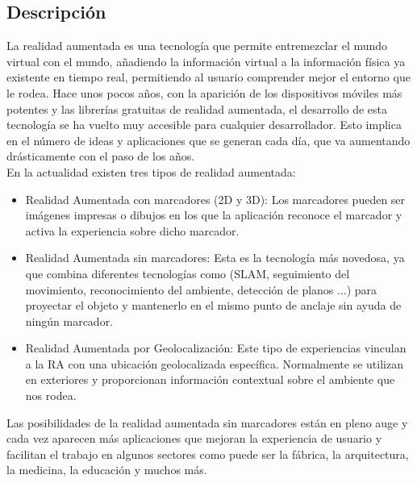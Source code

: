 \subsection{Descripción}
La realidad aumentada es una tecnología que permite entremezclar el mundo virtual con el mundo, añadiendo la información virtual a la información física ya existente en tiempo real, permitiendo al usuario comprender mejor el entorno que le rodea. Hace unos pocos años, con la aparición de los dispositivos móviles más potentes y las librerías gratuitas de realidad aumentada, el desarrollo de esta tecnología se ha vuelto muy accesible para cualquier desarrollador. Esto implica en el número de ideas y aplicaciones que se generan cada día, que va aumentando drásticamente con el paso de los años.\\
En la actualidad existen tres tipos de realidad aumentada:
\begin{itemize}
\item Realidad Aumentada con marcadores (2D y 3D): Los marcadores pueden ser imágenes impresas o dibujos en los que la aplicación reconoce el marcador y activa la experiencia sobre dicho marcador.
\item Realidad Aumentada sin marcadores: Esta es la tecnología más novedosa, ya que combina diferentes tecnologías como (SLAM, seguimiento del movimiento, reconocimiento del ambiente, detección de planos ...) para proyectar el objeto y mantenerlo en el mismo punto de anclaje sin ayuda de ningún marcador.
\item Realidad Aumentada por Geolocalización: Este tipo de experiencias vinculan a la RA con una ubicación geolocalizada específica. Normalmente se utilizan en exteriores y proporcionan información contextual sobre el ambiente que nos rodea.
\end{itemize}
Las posibilidades de la realidad aumentada sin marcadores están en pleno auge y cada vez aparecen más aplicaciones que mejoran la experiencia de usuario y facilitan el trabajo en algunos sectores como puede ser la fábrica, la arquitectura, la medicina, la educación y muchos más.

